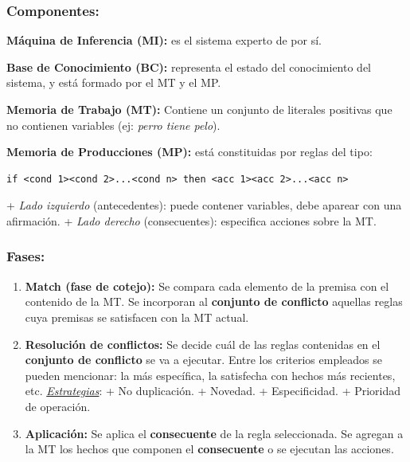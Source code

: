 \documentclass[10pt,a4paper]{article}
\begin{document}
\subsubsection{Componentes:}
\begin{description}
\item \textbf{Máquina de Inferencia (MI):} es el sistema experto de por sí.
\item \textbf{Base de Conocimiento (BC):} representa el estado del conocimiento del sistema, y está formado por el MT y el MP.
\item \textbf{Memoria de Trabajo (MT):} Contiene un conjunto de literales positivas que no contienen variables (ej: \textit{perro tiene pelo}).
\item \textbf{Memoria de Producciones (MP):} está constituidas por reglas del tipo:
\begin{verbatim}
if <cond 1><cond 2>...<cond n> then <acc 1><acc 2>...<acc n>
\end{verbatim}
\subitem + \textit{Lado izquierdo} (antecedentes): puede contener variables, debe aparear con una afirmación.
\subitem + \textit{Lado derecho} (consecuentes): especifica acciones sobre la MT.
\end{description}

\subsubsection{Fases:}
\begin{enumerate}
\item \textbf{Match (fase de cotejo):} Se compara cada elemento de la premisa con el contenido de la MT. Se incorporan al \textbf{conjunto de conflicto} aquellas reglas cuya premisas se satisfacen con la MT actual.
\item \textbf{Resolución de conflictos:} Se decide cuál de las reglas contenidas en el \textbf{conjunto de conflicto} se va a ejecutar. Entre los criterios empleados se pueden mencionar: la más específica, la satisfecha con hechos más recientes, etc. 
\subitem \underline{\textit{Estrategias}}:
\subitem + No duplicación.
\subitem + Novedad.
\subitem + Especificidad.
\subitem + Prioridad de operación.
\item \textbf{Aplicación:} Se aplica el \textbf{consecuente} de la regla seleccionada. Se agregan a la MT los hechos que componen el \textbf{consecuente} o se ejecutan las acciones.
\end{enumerate}
\end{document}
